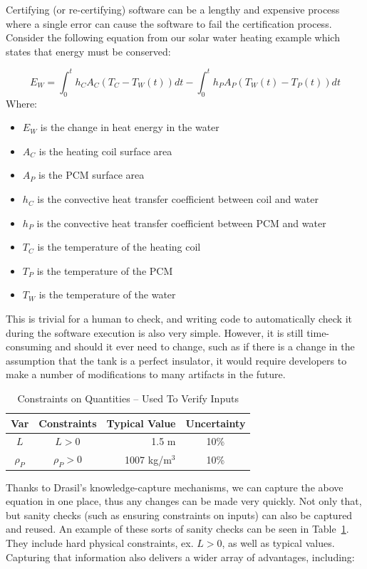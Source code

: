 \documentclass[sigconf]{acmart}
\newcommand{\authornt}[3]{\textcolor{#1}{[#3 ---#2]}}
\newcommand{\authornt}[3]{}
\newcommand{\wss}[1]{\authornt{blue}{SS}{#1}} %
\begin{document}
{Certifying (or re-certifying) software can be a lengthy and expensive process 
where a single error can cause the software to fail the certification process. 
Consider the following equation from our solar water heating example which 
states that energy must be conserved:

\begin{equation*}
E_W = \int_{0}^{t} h_C A_C (T_C - T_W(t)) dt - \int_{0}^{t} h_P A_P (T_W(t) - T_P(t)) dt
\end{equation*}
Where:
\begin{itemize}
	\item $E_W$ is the change in heat energy in the water
	\item $A_C$ is the heating coil surface area
	\item $A_P$ is the PCM surface area
	\item $h_C$ is the convective heat transfer coefficient between coil and 
	water
	\item $h_P$ is the convective heat transfer coefficient between PCM and 
	water 
	\item $T_C$ is the temperature of the heating coil
	\item $T_P$ is the temperature of the PCM
	\item $T_W$ is the temperature of the water
\end{itemize}

This is trivial for a human
to check, and writing code to automatically check it during the software
execution is also very simple. However, it is still time-consuming and should it
ever need to change, such as if there is a change in the assumption that the
tank is a perfect insulator, it would require developers to make a number of
modifications to many artifacts in the future.

\begin{table} 
\centering
\caption{Constraints on Quantities -- Used To Verify Inputs}
\begin{tabular}{c c r c } 
\toprule
\textbf{Var} & \textbf{Constraints} & \textbf{Typical Value} & \textbf{Uncertainty}\\ \midrule
$L$ & $L > 0$ & 1.5 m & 10\% \\ 
$\rho_P$ & $\rho_P > 0$	& 1007 kg/m$^3$	& 10\% \\
\bottomrule
\end{tabular}
\label{tab:pcm}
\end{table}

Thanks to Drasil's knowledge-capture mechanisms, we can capture the above 
equation in one place, thus any changes can be made very quickly. Not only 
that, but sanity checks (such as ensuring constraints on inputs) can also be 
captured and reused. An example of these sorts of sanity checks can be seen in 
Table~\ref{tab:pcm}. They include hard physical constraints, ex. $L > 0$, as 
well as typical values. Capturing that information also 
delivers a wider array of advantages, including:

}
\end{document}
